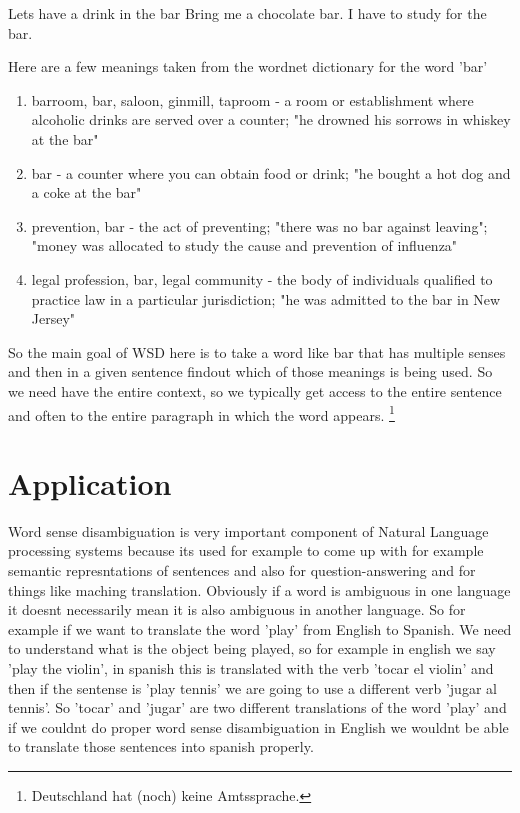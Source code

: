 \documentclass[article,dr=phil,type=drfinal,colorback,accentcolor=tud9c]{tudthesis}
\begin{document}
Lets have a drink in the bar
Bring me a chocolate bar.
I have to study for the bar.

Here are a few meanings taken from the wordnet dictionary for the word 'bar'

\begin{enumerate}
  \item barroom, bar, saloon, ginmill, taproom - a room or establishment where alcoholic drinks are served over a counter; "he drowned his sorrows in whiskey at the bar"
  \item bar - a counter where you can obtain food or drink; "he bought a hot dog and a coke at the bar"
  \item prevention, bar - the act of preventing; "there was no bar against leaving"; "money was allocated to study the cause and prevention of influenza"
  \item legal profession, bar, legal community - the body of individuals qualified to practice law in a particular jurisdiction; "he was admitted to the bar in New Jersey"
\end{enumerate}


So the main goal of WSD here is to take a word like bar that has multiple senses and then in a given sentence findout which of those meanings is being used. So we need have the entire context, so we typically get access to the entire sentence and often to the entire paragraph in which the word appears.
    \footnote{Deutschland hat (noch) keine Amtssprache.}

  \section{Application}
    Word sense disambiguation is very important component of Natural Language processing systems because its used for example to come up with for example semantic represntations of sentences and also for question-answering and for things like maching translation. Obviously if a word is ambiguous in one language it doesnt necessarily mean it is also ambiguous in another language. So for example if we want to translate the word 'play' from English to Spanish. We need to understand what is the object being played, so for example in english we say 'play the violin', in spanish this is translated with the verb 'tocar el violin' and then if the sentense is 'play tennis' we are going to use a different verb 'jugar al tennis'. So 'tocar' and 'jugar' are two different translations of the word 'play' and if we couldnt do proper word sense disambiguation in English we wouldnt be able to translate those sentences into spanish properly.
\end{document}
